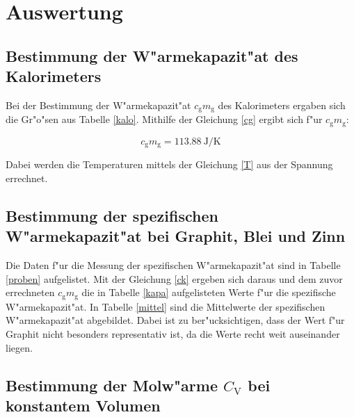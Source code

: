 \section{Auswertung}
\label{sec:auswertung}

\subsection{Bestimmung der W"armekapazit"at des Kalorimeters} %
\label{sub:bestimmung_der_w_armekapazit_at_des_kalorimeters}



Bei der Bestimmung der W"armekapazit"at $c_\mathrm{g}m_\mathrm{g}$ des Kalorimeters ergaben sich die Gr"o"sen aus Tabelle \ref{kalo}.
Mithilfe der Gleichung \eqref{cg} ergibt sich f"ur $c_\mathrm{g}m_\mathrm{g}$:

\begin{equation}
	c_\mathrm{g}m_\mathrm{g} = \SI{113.88}{\joule\per\kelvin}
\end{equation}

Dabei werden die Temperaturen mittels der Gleichung \eqref{T} aus der Spannung errechnet.

\subsection{Bestimmung der spezifischen W"armekapazit"at bei Graphit, Blei und Zinn} %
\label{sub:bestimmung_der_spezifischen_w_armekapazit_at_bei_graphit_blei_und_zinn}




Die Daten f"ur die Messung der spezifischen W"armekapazit"at sind in Tabelle \ref{proben} aufgelistet.
Mit der Gleichung \eqref{ck} ergeben sich daraus und dem zuvor errechneten $c_\mathrm{g}m_\mathrm{g}$ die in Tabelle \ref{kapa} aufgelisteten Werte f"ur die spezifische W"armekapazit"at.
In Tabelle \ref{mittel} sind die Mittelwerte der spezifischen W"armekapazit"at abgebildet. Dabei ist zu ber"ucksichtigen, dass der Wert f"ur Graphit nicht besonders representativ ist, da die Werte recht weit auseinander liegen.



\clearpage

\subsection{Bestimmung der Molw"arme $C_\mathrm{V}$ bei konstantem Volumen} %
\label{sub:bestimmung_der_molw_arme_c_mathrm}

